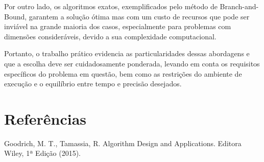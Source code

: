 \documentclass[12pt]{article}
\begin{document}
Por outro lado, os algoritmos exatos, exemplificados pelo método de Branch-and-Bound, garantem a solução ótima mas com um custo de recursos que pode ser inviável na grande maioria dos casos, especialmente para problemas com dimensões consideráveis, devido a sua complexidade computacional.

Portanto, o trabalho prático evidencia as particularidades dessas abordagens e que a escolha deve ser cuidadosamente ponderada, levando em conta os requisitos específicos do problema em questão, bem como as restrições do ambiente de execução e o equilíbrio entre tempo e precisão desejados.

\section{Referências}

Goodrich, M. T., Tamassia, R. Algorithm Design and Applications. Editora Wiley, 1ª Edição (2015).
\end{document}
